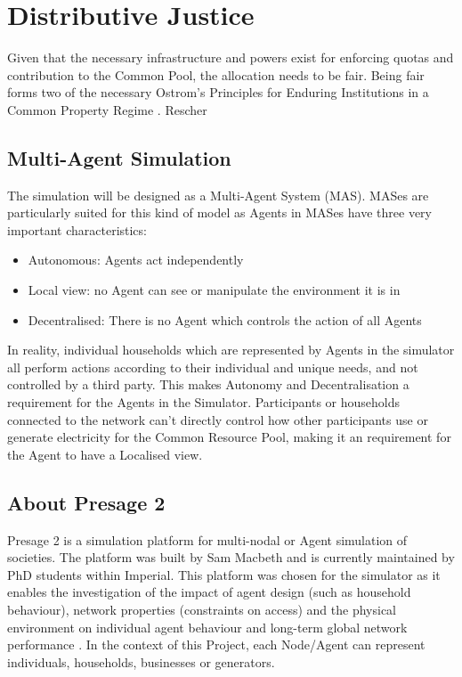 \section*{Distributive Justice}
Given that the necessary infrastructure and powers exist for enforcing quotas and contribution to the Common Pool, the allocation needs to be fair. Being fair forms two of the necessary Ostrom's Principles for Enduring Institutions in a Common Property Regime \cite{Ostrom:90}. Rescher

\subsection*{Multi-Agent Simulation}
The simulation will be designed as a Multi-Agent System (MAS). MASes are particularly suited for this kind of model as Agents in MASes have three very important characteristics:
\begin{itemize}
	\item Autonomous: Agents act independently
	\item Local view: no Agent can see or manipulate the environment it is in
	\item Decentralised: There is no Agent which controls the action of all Agents
\end{itemize}
In reality, individual households which are represented by Agents in the simulator all perform actions according to their individual and unique needs, and not controlled by a third party. This makes Autonomy and Decentralisation a requirement for the Agents in the Simulator. Participants or households connected to the network can't directly control how other participants use or generate electricity for the Common Resource Pool, making it an requirement for the Agent to have a Localised view. 

\subsection*{About Presage 2}
Presage 2 is a simulation platform for multi-nodal or Agent simulation of societies. The platform was built by Sam Macbeth and is currently maintained by PhD students within Imperial. This platform was chosen for the simulator as it enables the investigation of the impact of agent design (such as household behaviour), network properties (constraints on access) and the physical environment on individual agent behaviour and long-term global network performance \cite{Presage2-Desc:2015}. In the context of this Project, each Node/Agent can represent individuals, households, businesses or generators. 

